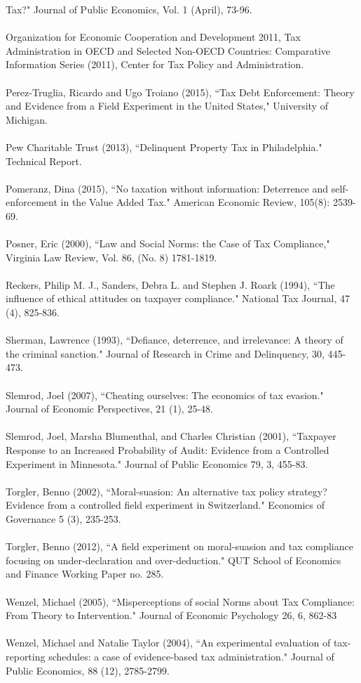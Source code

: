 \documentclass[12pt,titlepage]{article}
\begin{document}
Tax?" Journal of Public Economics, Vol. 1 (April),
73-96. \\ 
\\ 
Organization for Economic Cooperation and Development 2011, Tax
Administration in OECD and Selected Non-OECD Countries: Comparative
Information Series (2011), Center for Tax Policy and Administration.
\\ 
\\ 
Perez-Truglia, Ricardo and Ugo Troiano (2015), ``Tax Debt Enforcement:
Theory and Evidence from a Field Experiment in the United States,"
University of Michigan.  \\ 
\\ 
Pew Charitable Trust (2013), ``Delinquent Property Tax in
Philadelphia." Technical Report. \\ 
\\ 
Pomeranz, Dina (2015), ``No taxation without information: Deterrence
and self-enforcement in the Value Added Tax."  American Economic Review, 
105(8): 2539-69. \\ 
\\ 
Posner, Eric (2000), ``Law and Social Norms: the Case of Tax
Compliance," Virginia Law Review, Vol. 86, (No. 8)
1781-1819. \\ 
\\ 
Reckers, Philip M. J., Sanders, Debra L. and Stephen J. Roark (1994),
``The influence of ethical attitudes on taxpayer compliance." National
Tax Journal, 47 (4), 825-836. \\ 
\\ 
Sherman, Lawrence (1993), ``Defiance, deterrence, and irrelevance: A
theory of the criminal sanction."  Journal of Research in Crime and
Delinquency, 30, 445-473. \\ 
\\ 
Slemrod, Joel (2007), ``Cheating ourselves: The economics of tax
evasion." Journal of Economic Perspectives, 21 (1),
25-48. \\ 
\\ 
Slemrod, Joel, Marsha Blumenthal, and Charles Christian (2001),
``Taxpayer Response to an Increased Probability of Audit: Evidence
from a Controlled Experiment in Minnesota." Journal of Public
Economics 79, 3, 455-83.\\ 
\\ 
Torgler, Benno (2002), ``Moral-suasion: An alternative tax policy
strategy?  Evidence from a controlled field experiment in
Switzerland." Economics of Governance 5 (3), 235-253. \\ 
\\ 
Torgler, Benno (2012), ``A field experiment on moral-suasion and tax
compliance focusing on under-declaration and over-deduction." QUT
School of Economics and Finance Working Paper no. 285. \\ 
\\ 
Wenzel, Michael (2005), ``Misperceptions of social Norms about Tax
Compliance: From Theory to Intervention." Journal of Economic
Psychology 26, 6, 862-83\\ 
\\ 
Wenzel, Michael and Natalie Taylor (2004), ``An experimental
evaluation of tax-reporting schedules: a case of evidence-based tax
administration." Journal of Public Economics, 88 (12), 2785-2799.
\end{document}
